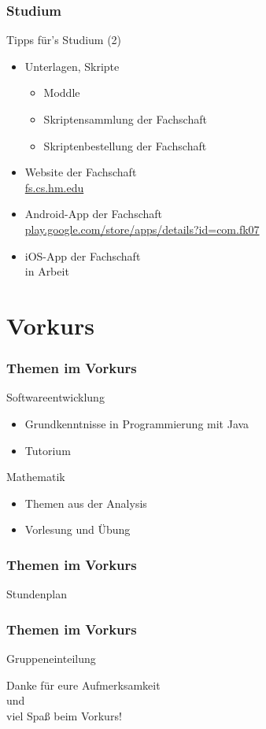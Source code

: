 \documentclass{beamer}
\begin{document}
	\begin{frame}
		\frametitle{Studium}
		Tipps für's Studium (2)
		\begin{itemize}
			\item Unterlagen, Skripte 
			\begin{itemize}
				\item Moddle
				\item Skriptensammlung der Fachschaft
				\item Skriptenbestellung der Fachschaft
			\end{itemize}
			\pause
			\item Website der Fachschaft\\ \url{fs.cs.hm.edu}
			\pause
			\item Android-App der Fachschaft\\ \url{play.google.com/store/apps/details?id=com.fk07}
			\pause
			\item iOS-App der Fachschaft\\
			in Arbeit	
		\end{itemize}
	\end{frame}
	
	\section{Vorkurs}
	
	\begin{frame}
		\frametitle{Themen im Vorkurs}
		Softwareentwicklung
		\begin{itemize}
			\item Grundkenntnisse in Programmierung mit Java
			\item Tutorium
		\end{itemize}
		\bigskip
		Mathematik
		\begin{itemize}
			\item Themen aus der Analysis
			\item Vorlesung und Übung
		\end{itemize}
	\end{frame}
	
	\begin{frame}
		\frametitle{Themen im Vorkurs}
		Stundenplan
	\end{frame}
	
	\begin{frame}
		\frametitle{Themen im Vorkurs}
		Gruppeneinteilung
	\end{frame}
	
	\begin{frame}
		\center Danke für eure Aufmerksamkeit\\ und\\ viel Spaß beim Vorkurs!
	\end{frame}
\end{document}
